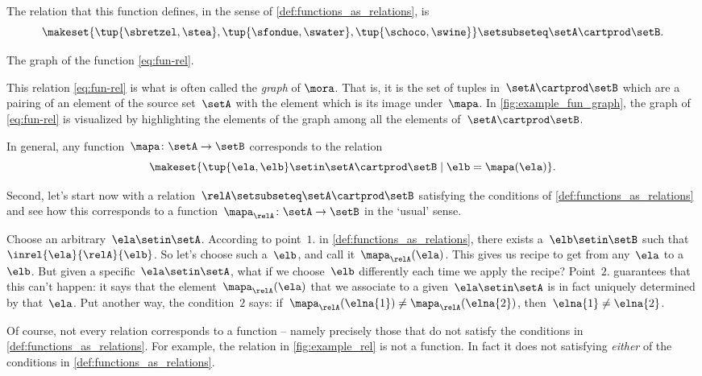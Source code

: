 The relation that this function defines, in the sense of \cref{def:functions_as_relations}, is
%
\begin{equation*}
    \label{eq:fun-rel}
    \makeset{ \tup{\sbretzel, \stea}, \tup{\sfondue, \swater}, \tup{\schoco, \swine} } \setsubseteq \setA \cartprod \setB.
\end{equation*}

\begin{marginfigure}
    \centering
    \caption{The graph of the function \cref{eq:fun-rel}.}
    \label{fig:example_fun_graph}
\end{marginfigure}

This relation \cref{eq:fun-rel} is what is often called the \emph{graph} of $\mora$.
That is, it is the set of tuples in~$\setA \cartprod \setB$ which are a pairing of an element of the source set~$\setA$ with the element which is its image under~$\mapa$.
In \cref{fig:example_fun_graph}, the graph of \cref{eq:fun-rel} is visualized by highlighting the elements of the graph among all the elements of~$\setA \cartprod \setB$.

In general, any function~$\mapa \colon \setA \to \setB$ corresponds to the relation
\begin{equation*}
    \makeset{ \tup{\ela,\elb} \setin \setA \cartprod \setB \mid \elb= \mapa(\ela) }.
\end{equation*}

Second, let's start now with a relation~$\relA \setsubseteq \setA \cartprod \setB$ satisfying the conditions of \cref{def:functions_as_relations} and see how this corresponds to a function~$\mapa_\relA \colon \setA \to \setB$ in the `usual' sense.

Choose an arbitrary~$\ela \setin \setA$.
According to point~$1.
$ in \cref{def:functions_as_relations}, there exists a~$\elb \setin \setB$ such that~$\inrel{\ela}{\relA}{\elb}$.
So let's choose such a~$\elb$, and call it~$\mapa_\relA(\ela)$.
This gives us recipe to get from any~$\ela$ to a~$\elb$.
But given a specific~$\ela \setin \setA$, what if we choose~$\elb$ differently each time we apply the recipe?
Point~$2.
$ guarantees that this can't happen: it says that the element~$\mapa_\relA(\ela)$ that we associate to a given~$\ela \setin \setA$ is in fact uniquely determined by that~$\ela$.
Put another way, the condition~$2$ says: if~$\mapa_\relA(\elna{1}) \neq \mapa_\relA(\elna{2})$, then~$\elna{1} \neq\elna{2}$.

\begin{remark}
    Of course, not every relation corresponds to a function -- namely precisely those that do not satisfy the conditions in \cref{def:functions_as_relations}.
    For example, the relation in \cref{fig:example_rel} is not a function.
    In fact it does not satisfying \emph{either} of the conditions in \cref{def:functions_as_relations}.
\end{remark}

